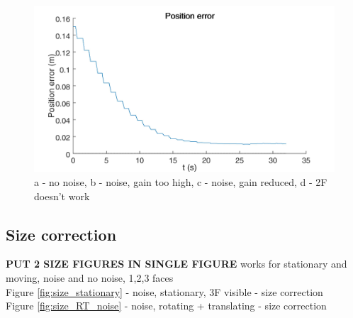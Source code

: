 \begin{figure}
{\begin{minipage}[b]{0.45\columnwidth}
  		\includegraphics[width=1\textwidth,trim = 0mm 0mm 0mm 0mm,clip]{./Figures/position_error_3_stationary_1F_noise}\vspace*{0ex}
 	\end{minipage}}
 	\caption{a - no noise, b - noise, gain too high, c - noise, gain reduced, d - 2F doesn't work}
 	\label{fig:position_update}
\end{figure}

\subsection{Size correction}
\textbf{PUT 2 SIZE FIGURES IN SINGLE FIGURE}
works for stationary and moving, noise and no noise, 1,2,3 faces\\
Figure \ref{fig:size_stationary}  - noise, stationary, 3F visible - size correction\\
Figure \ref{fig:size_RT_noise}  - noise, rotating + translating - size correction\\


